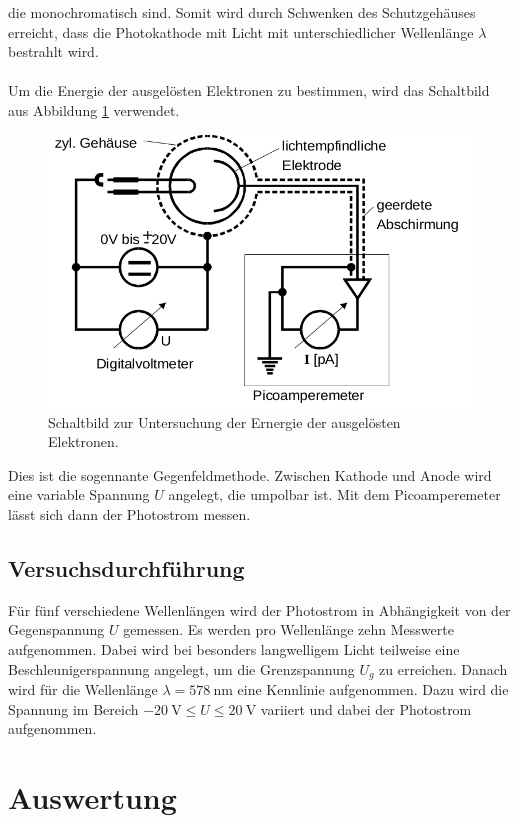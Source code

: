 die monochromatisch sind. Somit wird durch Schwenken des Schutzgehäuses erreicht, dass die Photokathode
mit Licht mit unterschiedlicher Wellenlänge $\lambda$ bestrahlt wird. \\
\\
Um die Energie der ausgelösten Elektronen zu bestimmen, wird das Schaltbild aus Abbildung \ref{fig:4}
verwendet.
\begin{figure}[h]
  \centering
  \includegraphics[scale=0.4]{schaltbild.png}
  \caption{Schaltbild zur Untersuchung der Ernergie der ausgelösten Elektronen.}
  \label{fig:4}
\end{figure}
Dies ist die sogennante Gegenfeldmethode. Zwischen Kathode und Anode wird eine variable
Spannung $U$ angelegt, die umpolbar ist. Mit dem Picoamperemeter lässt sich dann der
Photostrom messen.
\subsection{Versuchsdurchführung}
Für fünf verschiedene Wellenlängen wird der Photostrom in Abhängigkeit von der Gegenspannung
$U$ gemessen. Es werden pro Wellenlänge zehn Messwerte aufgenommen. Dabei wird bei besonders
langwelligem Licht teilweise eine Beschleunigerspannung angelegt, um die Grenzspannung
$U_g$ zu erreichen. Danach wird für die Wellenlänge
$\lambda = \SI{578}{\nano\meter}$ eine Kennlinie aufgenommen. Dazu wird die Spannung
im Bereich $\SI{-20}{\volt} \leq U \leq \SI{20}{\volt}$ variiert und dabei der Photostrom
aufgenommen.

\section{Auswertung}
